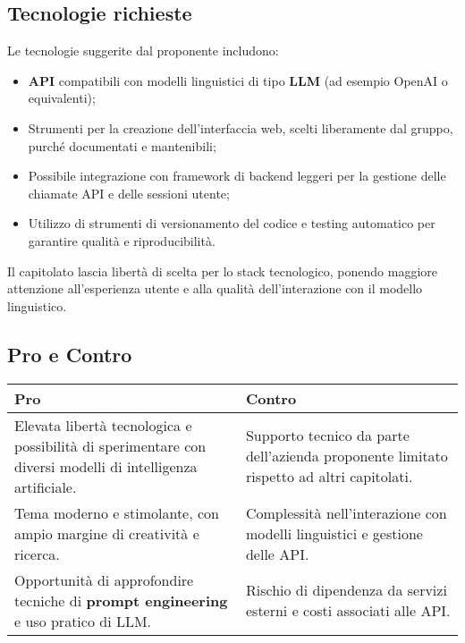 \documentclass[a4paper,12pt]{article}
\begin{document}
{{{    \subsection{Tecnologie richieste}
        Le tecnologie suggerite dal proponente includono:
        \begin{itemize}
            \item \textbf{API} compatibili con modelli linguistici di tipo \textbf{LLM} (ad esempio OpenAI o equivalenti);
            \item Strumenti per la creazione dell’interfaccia web, scelti liberamente dal gruppo, purché documentati e mantenibili;
            \item Possibile integrazione con framework di backend leggeri per la gestione delle chiamate API e delle sessioni utente;
            \item Utilizzo di strumenti di versionamento del codice e testing automatico per garantire qualità e riproducibilità.
        \end{itemize}
        Il capitolato lascia libertà di scelta per lo stack tecnologico, ponendo maggiore attenzione all’esperienza utente e alla qualità dell’interazione con il modello linguistico.
    

    \subsection{Pro e Contro}
        \begin{center}
            \begin{tabular}{|p{9cm}|p{5cm}|}
                \hline
                \textbf{Pro} & \textbf{Contro} \\
                \hline
                Elevata libertà tecnologica e possibilità di sperimentare con diversi modelli di intelligenza artificiale. & Supporto tecnico da parte dell’azienda proponente limitato rispetto ad altri capitolati. \\
                \hline
                Tema moderno e stimolante, con ampio margine di creatività e ricerca. & Complessità nell’interazione con modelli linguistici e gestione delle API. \\
                \hline
                Opportunità di approfondire tecniche di \textbf{prompt engineering} e uso pratico di LLM. & Rischio di dipendenza da servizi esterni e costi associati alle API. \\
                \hline
            \end{tabular}
        \end{center}
    

}}}
\end{document}
